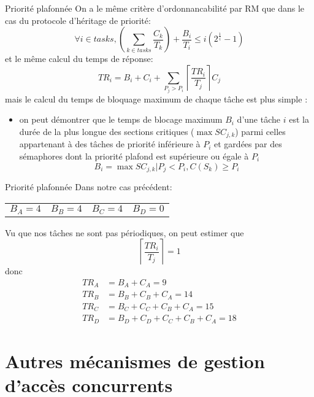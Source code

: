 \begin{frame}{Priorité plafonnée}
  On a  le même critère d'ordonnancabilité  par RM que dans  le cas du
  protocole d'héritage de priorité:
  $$\forall i \in tasks, \left( \sum_{k \in tasks} \frac{C_k}{T_k} \right) + \frac{B_i}{T_i} ≤ i \left(2^{\frac{1}{i}}-1\right)$$
  et le même calcul du temps de réponse:
  $$TR_i = B_i + C_i + \sum_{P_j > P_i} \left\lceil\frac{TR_i}{T_j}\right\rceil C_j$$
  mais le calcul du temps de bloquage maximum de chaque tâche est plus
  simple :
  \begin{itemize}
  \item on peut démontrer que  le temps de blocage maximum $B_i$ d'une
    tâche $i$  est la durée de  la plus longue  des sections critiques
    ($\max  SC_{j,k}$)  parmi  celles  appartenant  à  des  tâches  de
    priorité inférieure à $P_i$ et  gardées par des sémaphores dont la
    priorité plafond est supérieure ou égale à $P_i$
    $$B_i = \max SC_{j,k} | P_j < P_i, C(S_k) ≥ P_i$$
  \end{itemize}
\end{frame}

\begin{frame}{Priorité plafonnée}
  Dans notre cas précédent:
  \begin{center}
    \begin{tabular}{cccc}
      $B_A = 4$ & $B_B = 4$ & $B_C = 4$ & $B_D = 0$\\
    \end{tabular}
  \end{center}
  Vu que nos tâches ne sont pas périodiques, on peut estimer que
  $$ \left\lceil\frac{TR_i}{T_j}\right\rceil = 1 $$
  donc
  \begin{align*}
    TR_A &= B_A + C_A = 9\\
    TR_B &= B_B + C_B + C_A = 14\\
    TR_C &= B_C + C_C + C_B + C_A = 15\\
    TR_D &= B_D + C_D + C_C + C_B + C_A = 18
  \end{align*}
\end{frame}


\section{Autres mécanismes de gestion d'accès concurrents}


